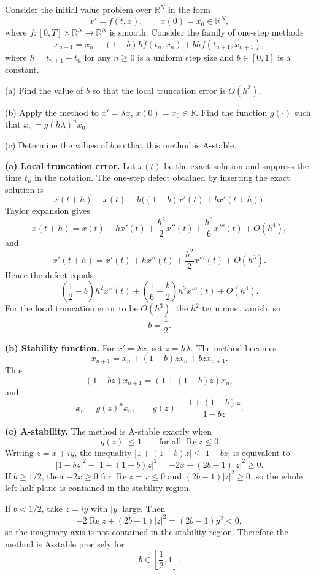 \begin{exercise}
\label{applied:2026:3}
Consider the initial value problem over $\mathbb{R}^N$ in the form
\[
x'=f(t,x),\qquad x(0)=x_0\in \mathbb{R}^N,
\]
where $f:[0,T]\times \mathbb{R}^N\to \mathbb{R}^N$ is smooth. Consider the family of one-step
methods
\[
x_{n+1}=x_n+(1-b)hf(t_n,x_n)+bhf(t_{n+1},x_{n+1}),
\]
where $h=t_{n+1}-t_n$ for any $n\geq 0$ is a uniform step size and $b\in[0,1]$ is a constant.

(a) Find the value of $b$ so that the local truncation error is $O(h^3)$.

(b) Apply the method to $x'=\lambda x$, $x(0)=x_0\in \mathbb{R}$. Find the function $g(\cdot)$
such that $x_n=g(h\lambda)^n x_0$.

(c) Determine the values of $b$ so that this method is A-stable.
\end{exercise}

\begin{solution}
\textbf{(a) Local truncation error.}
Let $x(t)$ be the exact solution and suppress the time $t_n$ in the notation. The one-step
defect obtained by inserting the exact solution is
\[
x(t+h)-x(t)-h\bigl((1-b)x'(t)+bx'(t+h)\bigr).
\]
Taylor expansion gives
\[
x(t+h)=x(t)+hx'(t)+\frac{h^2}{2}x''(t)+\frac{h^3}{6}x'''(t)+O(h^4),
\]
and
\[
x'(t+h)=x'(t)+hx''(t)+\frac{h^2}{2}x'''(t)+O(h^3).
\]
Hence the defect equals
\[
\left(\frac{1}{2}-b\right)h^2x''(t)
+\left(\frac{1}{6}-\frac{b}{2}\right)h^3x'''(t)+O(h^4).
\]
For the local truncation error to be $O(h^3)$, the $h^2$ term must vanish, so
\[
b=\frac{1}{2}.
\]

\textbf{(b) Stability function.}
For $x'=\lambda x$, set $z=h\lambda$. The method becomes
\[
x_{n+1}=x_n+(1-b)zx_n+bzx_{n+1}.
\]
Thus
\[
(1-bz)x_{n+1}=(1+(1-b)z)x_n,
\]
and
\[
x_n=g(z)^n x_0,\qquad
g(z)=\frac{1+(1-b)z}{1-bz}.
\]

\textbf{(c) A-stability.}
The method is A-stable exactly when
\[
|g(z)|\leq 1\qquad \text{for all }\operatorname{Re}z\leq 0.
\]
Writing $z=x+iy$, the inequality $|1+(1-b)z|\leq |1-bz|$ is equivalent to
\[
|1-bz|^2-|1+(1-b)z|^2=-2x+(2b-1)|z|^2\geq 0.
\]
If $b\geq 1/2$, then $-2x\geq 0$ for $\operatorname{Re}z=x\leq 0$ and
$(2b-1)|z|^2\geq 0$, so the whole left half-plane is contained in the stability region.

If $b<1/2$, take $z=iy$ with $|y|$ large. Then
\[
-2\operatorname{Re}z+(2b-1)|z|^2=(2b-1)y^2<0,
\]
so the imaginary axis is not contained in the stability region. Therefore the method is
A-stable precisely for
\[
b\in\left[\frac{1}{2},1\right].
\]
\end{solution}

